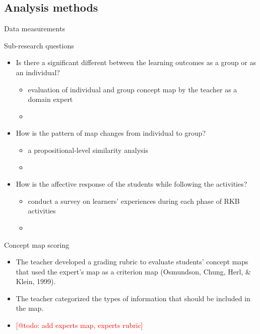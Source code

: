 \subsection{Analysis methods}

\begin{frame}{Data measurements}
    \begin{alertblock}{Sub-research questions}
        \begin{itemize}
        \item Is there a significant different between the learning outcomes as a group
        or as an individual?
        \begin{itemize}
            \item evaluation of individual and group concept map by the teacher 
                  as a domain expert
            \item
        \end{itemize}
        
        \item How is the pattern of map changes from individual to group?
        \begin{itemize}
            \item a propositional-level similarity analysis
            \item
        \end{itemize}
        
        \item How is the affective response of the students while following the activities?
        \begin{itemize}
            \item conduct a survey on learners' experiences during each phase of RKB activities
            \item
        \end{itemize}
        \end{itemize}
    \end{alertblock}
\end{frame}

\begin{frame}{Concept map scoring}
    \begin{itemize}
        \item The teacher developed a grading rubric to evaluate students’ 
        concept maps that used the expert’s map as a criterion map 
        (Osmundson, Chung, Herl, \& Klein, 1999). 
        \item The teacher categorized the types of information that should be included in the map.
        \item \textcolor{red}{[@todo: add experts map, experts rubric]}
    \end{itemize}
\end{frame}

